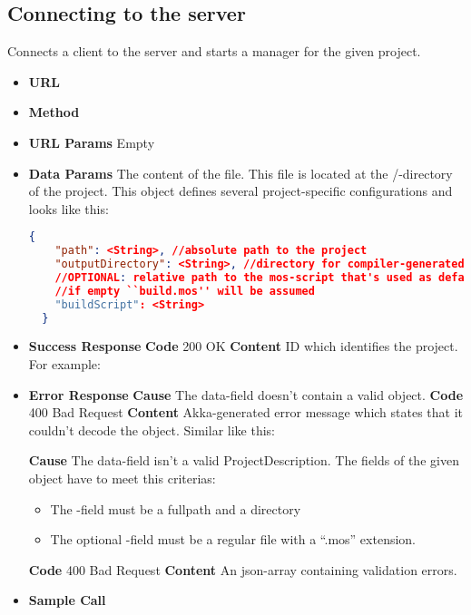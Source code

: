 \subsection{Connecting to the server}
Connects a client to the server and starts a manager for the given project.



\begin{itemize}
\item \textbf{URL} 
\item \textbf{Method} 
\item \textbf{URL Params} Empty
\item \textbf{Data Params}
  The content of the  file. This file is located at the /-directory of the project.
  This object defines several project-specific configurations and looks like this:
  \begin{lstlisting}[basicstyle=\small,language=json]
  {
    "path": <String>, //absolute path to the project
    "outputDirectory": <String>, //directory for compiler-generated files
    //OPTIONAL: relative path to the mos-script that's used as default-script
    //if empty ``build.mos'' will be assumed
    "buildScript": <String>
  }
  \end{lstlisting}
\item \textbf{Success Response}
  \newline\textbf{Code} 200 OK
  \newline\textbf{Content} ID which identifies the project. For example: 
\item \textbf{Error Response}
  \newline\textbf{Cause} The data-field doesn't contain a valid object.
  \newline\textbf{Code} 400 Bad Request
  \newline\textbf{Content} Akka-generated error message which states that it couldn't decode the
  object. Similar like this: 

  \fixedspace\textbf{Cause} The data-field isn't a valid ProjectDescription.
  The fields of the given object have to meet this criterias:
  \begin{itemize}
  \item The -field must be a fullpath and a directory
  \item The optional -field must be a regular file with a ``.mos'' extension.
  \end{itemize}
  \textbf{Code} 400 Bad Request
  \newline\textbf{Content} An json-array containing validation errors.
  \item \textbf{Sample Call}
\end{itemize}

